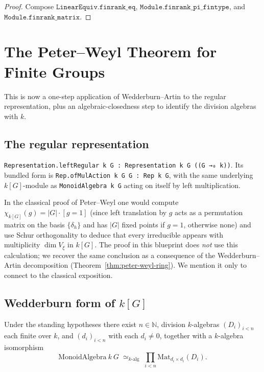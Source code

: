 \begin{proof}\leanok
  Compose $\texttt{LinearEquiv.finrank\_eq}$,
  $\texttt{Module.finrank\_pi\_fintype}$, and
  $\texttt{Module.finrank\_matrix}$.
\end{proof}


\chapter{The Peter–Weyl Theorem for Finite Groups}
\label{chap:peter-weyl}

This is now a one-step application of Wedderburn–Artin to the regular
representation, plus an algebraic-closedness step to identify the division
algebras with $k$.

\section{The regular representation}

\begin{definition}
  \label{def:regular}
  \mathlibok
  \texttt{Representation.leftRegular k G : Representation k G ((G →₀ k))}.
  Its bundled form is \texttt{Rep.ofMulAction k G G : Rep k G}, with the same
  underlying $k[G]$-module as \texttt{MonoidAlgebra k G} acting on itself by
  left multiplication.
\end{definition}

\begin{remark}
  In the classical proof of Peter--Weyl one would compute
  $\chi_{k[G]}(g) = |G|\cdot[g = 1]$
  (since left translation by $g$ acts as a permutation matrix on the basis
  $\{\delta_h\}$ and has $|G|$ fixed points if $g = 1$, otherwise none) and
  use Schur orthogonality to deduce that every irreducible appears with
  multiplicity $\dim V_\xi$ in $k[G]$. The proof in this blueprint does
  \emph{not} use this calculation; we recover the same conclusion as a
  consequence of the Wedderburn--Artin decomposition
  (Theorem~\ref{thm:peter-weyl-ring}). We mention it only to connect to the
  classical exposition.
\end{remark}

\section{Wedderburn form of $k[G]$}

\begin{theorem}
  \label{thm:wedderburn-kG}
  \mathlibok
  \leanok
  Under the standing hypotheses there exist
  $n \in \mathbb N$, division $k$-algebras $(D_i)_{i < n}$ each finite
  over $k$, and $(d_i)_{i < n}$ with each $d_i \ne 0$, together with a
  $k$-algebra isomorphism
  \[
     \mathrm{MonoidAlgebra}\ k\ G \;\simeq_{k\text{-alg}}\;
     \prod_{i < n} \mathrm{Mat}_{d_i \times d_i}(D_i).
  \]
\end{theorem}

